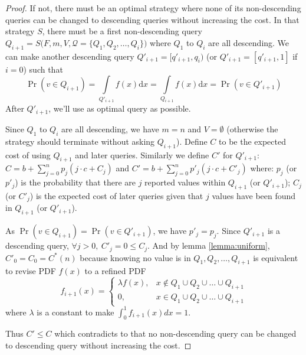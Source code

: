 \begin{proof}

If not, there must be an optimal strategy where none of its
non-descending queries can be changed to descending queries without increasing
the cost. In that strategy $S$, there must be a first non-descending query
$Q_{i+1} = S\big(F, m, V, \mathcal Q = \{Q_1, Q_2, \ldots, Q_i\}\big)$ where
$Q_1$ to $Q_i$ are all descending.  We can make another descending query
$Q'_{i+1} = [q'_{i+1}, q_i)$ (or $Q'_{i+1} = [q'_{i+1}, 1]$ if $i = 0$) such
that
\[
\Pr(v \in Q_{i+1}) = \int \limits_{Q'_{i+1}} f(x) \mathrm d x = \int \limits_{Q_{i+1}} f(x) \mathrm d x = \Pr(v \in Q'_{i+1})
\]
After $Q'_{i+1}$, we'll use as optimal query as
possible.

Since $Q_1$ to $Q_i$ are all descending, we have $m = n$ and $V = \emptyset$ (otherwise
the strategy should terminate without asking $Q_{i+1}$).
Define $C$ to be the expected cost of using $Q_{i+1}$ and later queries. Similarly we define $C'$ for $Q'_{i+1}$:\\
$
C = b + \sum_{j=0}^n p_j ( j \cdot c + C_j)
$
and
$
C' = b + \sum_{j=0}^n p'_j ( j \cdot c + C'_j)
$
where:
$p_j$ (or $p'_j$) is the probability that there are $j$ reported values within $Q_{i+1}$ (or $Q'_{i+1}$);
$C_j$ (or $C'_j$) is the expected cost of later queries given that $j$ values have been
found in $Q_{i+1}$ (or $Q'_{i+1}$).

As $\Pr(v \in Q_{i+1}) = \Pr(v \in Q'_{i+1})$, we have $p'_j = p_j$. Since $Q'_{i+1}$ is a
descending query, $\forall j > 0, ~C'_j = 0 \leq C_j$. And by lemma \ref{lemma:uniform},
$C'_0 = C_0 = C^*(n)$ because knowing no value is in $Q_1, Q_2, \ldots, Q_{i+1}$ is equivalent
to revise PDF $f(x)$ to a refined PDF 
\[
f_{i+1}(x) = \begin{cases}
	\lambda f(x), & x \notin Q_1 \cup Q_2 \cup \ldots \cup Q_{i+1} \\
	0, & x \in Q_1 \cup Q_2 \cup \ldots \cup Q_{i+1}
\end{cases}
\]
where $\lambda$ is a constant to make $\int_0^1 f_{i+1}(x) dx = 1$.

Thus $C' \leq C$ which contradicts to that no non-descending query can be changed to
descending query without increasing the cost.

\end{proof}


